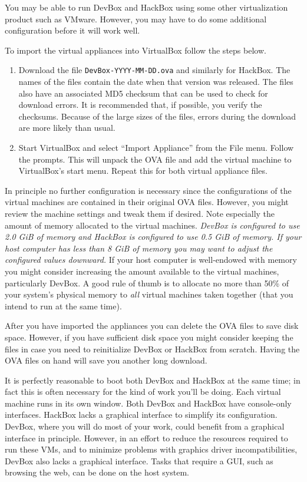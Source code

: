 \documentclass[twocolumn]{article}
\begin{document}
You may be able to run DevBox and HackBox using some other virtualization product such as
VMware. However, you may have to do some additional configuration before it will work well.

To import the virtual appliances into VirtualBox follow the steps below.

\begin{enumerate}

\item Download the file \texttt{DevBox-YYYY-MM-DD.ova} and similarly for HackBox. The names of
  the files contain the date when that version was released. The files also have an associated
  MD5 checksum that can be used to check for download errors. It is recommended that, if
  possible, you verify the checksums. Because of the large sizes of the files, errors during the
  download are more likely than usual.

\item Start VirtualBox and select ``Import Appliance'' from the File menu. Follow the prompts.
  This will unpack the OVA file and add the virtual machine to VirtualBox's start menu. Repeat
  this for both virtual appliance files.

\end{enumerate}

In principle no further configuration is necessary since the configurations of the virtual
machines are contained in their original OVA files. However, you might review the machine
settings and tweak them if desired. Note especially the amount of memory allocated to the
virtual machines. \emph{DevBox is configured to use 2.0 GiB of memory and HackBox is configured
to use 0.5 GiB of memory. If your host computer has less than 8 GiB of memory you may want to
adjust the configured values downward.} If your host computer is well-endowed with memory you
might consider increasing the amount available to the virtual machines, particularly DevBox. A
good rule of thumb is to allocate no more than 50\% of your system's physical memory to
\emph{all} virtual machines taken together (that you intend to run at the same time).

After you have imported the appliances you can delete the OVA files to save disk space. However,
if you have sufficient disk space you might consider keeping the files in case you need to
reinitialize DevBox or HackBox from scratch. Having the OVA files on hand will save you another
long download.

It is perfectly reasonable to boot both DevBox and HackBox at the same time; in fact this is
often necessary for the kind of work you'll be doing. Each virtual machine runs in its own
window. Both DevBox and HackBox have console-only interfaces. HackBox lacks a graphical
interface to simplify its configuration. DevBox, where you will do most of your work, could
benefit from a graphical interface in principle. However, in an effort to reduce the resources
required to run these VMs, and to minimize problems with graphics driver incompatibilities,
DevBox also lacks a graphical interface. Tasks that require a GUI, such as browsing the web, can
be done on the host system.
\end{document}
